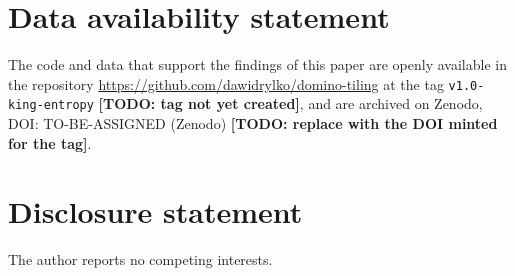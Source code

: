 \documentclass[11pt]{amsart}
\theoremstyle{definition}
\theoremstyle{remark}
\newcommand{\TODO}[1]{\textbf{[TODO: #1]}}
\begin{document}
\section*{Data availability statement}
The code and data that support the findings of this paper are openly available in the
repository \url{https://github.com/dawidrylko/domino-tiling} at the tag
\texttt{v1.0-king-entropy} \TODO{tag not yet created}, and are archived on Zenodo,
DOI: TO-BE-ASSIGNED (Zenodo) \TODO{replace with the DOI minted for the tag}.

\section*{Disclosure statement}
The author reports no competing interests.



\end{document}
